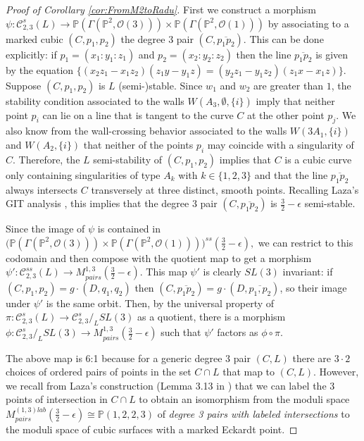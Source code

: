 \documentclass{amsart}
\newcommand{\Pj}{\mathbb{P}}
\newcommand{\mc}{\mathcal}
\numberwithin{equation}{section}
\theoremstyle{definition}
\begin{document}
\begin{proof}[Proof of Corollary \ref{cor:FromM2toRadu}]
    First we construct a morphism $\psi: \mc{C}_{2,3}^{s}(L) \rightarrow \Pj(\Gamma(\Pj^2, \mc{O}(3))) \times \Pj(\Gamma(\Pj^2, \mc{O}(1)))$ by associating to a marked cubic $(C,p_1, p_2)$ the degree $3$ pair $(C, \overline{p_1p_2}).$ This can be done explicitly: if $p_1 = (x_1:y_1:z_1)$ and $p_2 = (x_2:y_2:z_2)$ then the line $\overline{p_1p_2}$ is given by the equation $\{ (x_2z_1 - x_1z_2)(z_1y-y_1z) = (y_2z_1 - y_1z_2)(z_1x - x_1z) \}$. Suppose $(C,p_1,p_2)$ is $L$ (semi-)stable. Since $w_1$ and $w_2$ are greater than $1$, the stability condition associated to the walls $W(A_3, \emptyset, \{i\})$ imply that neither point $p_i$ can lie on a line that is tangent to the curve $C$ at the other point $p_j$. We also know from the wall-crossing behavior associated to the walls $W(3A_1, \{i\})$ and $W(A_2, \{i\})$ that neither of the points $p_i$ may coincide with a singularity of $C$. Therefore, the $L$ semi-stability of $(C,p_1,p_2)$ implies that $C$ is a cubic curve only containing singularities of type $A_k$  with $k\in \{1,2, 3 \}$ and that the line $\overline{p_1p_2}$ always intersects $C$ transversely at three distinct, smooth points. Recalling Laza's GIT analysis \cite[Theorem 3.2]{LazaThesis}, this implies that the degree $3$ pair $(C, \overline{p_1p_2})$ is $\frac{3}{2} - \epsilon$ semi-stable.

    Since the image of $\psi$ is contained in $\big( \Pj(\Gamma(\Pj^2, \mc{O}(3))) \times \Pj(\Gamma(\Pj^2, \mc{O}(1))) \big)^{ss}(\frac{3}{2}- \epsilon), $ we can restrict to this codomain and then compose with the quotient map to get a morphism $\psi':  \mc{C}_{2,3}^{ss}(L) \rightarrow M^{1,3}_{pairs}(\frac{3}{2}- \epsilon).$ This map $\psi'$ is clearly $SL(3)$ invariant: if $(C, p_1,p_2) = g \cdot (D, q_1, q_2)$ then $(C,\overline{p_1p_2}) = g \cdot (D, \overline{p_1,p_2})$, so their image under $\psi'$ is the same orbit. Then, by the universal property of $\pi: \mc{C}_{2,3}^{s}(L) \rightarrow \mc{C}_{2,3}^s \slash_L SL(3)$ as a quotient, there is a morphism $\phi: \mc{C}_{2,3}^s \slash_L SL(3) \rightarrow  M^{1,3}_{pairs}(\frac{3}{2}- \epsilon)$ such that $\psi'$ factors as $ \phi \circ \pi.$

    The above map is 6:1 because for a generic degree $3$ pair $(C,L)$ there are $3 \cdot 2$ choices of ordered pairs of points in the set $C \cap L$ that map to $(C,L)$. However, we recall from Laza's construction  (Lemma 3.13 in \cite{LazaThesis}) that we can label the $3$ points of intersection in $C \cap L$ to obtain an isomorphism from the moduli space $M^{(1,3)lab}_{pairs}(\frac{3}{2}- \epsilon)\cong \mathbb{P}(1,2,2,3)$ of \textit{degree 3 pairs with labeled intersections} to the moduli space of cubic surfaces with a marked Eckardt point.
    

\end{proof}
\end{document}
